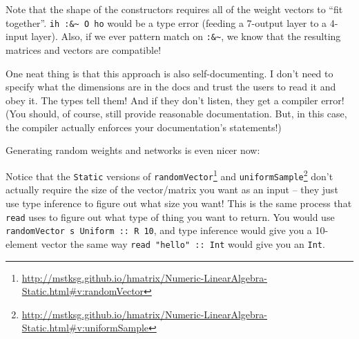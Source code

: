 \documentclass[]{article}
\newenvironment{Shaded}{}{}
\newcommand{\KeywordTok}[1]{\textcolor[rgb]{0.00,0.44,0.13}{\textbf{{#1}}}}
\newcommand{\DataTypeTok}[1]{\textcolor[rgb]{0.56,0.13,0.00}{{#1}}}
\newcommand{\DecValTok}[1]{\textcolor[rgb]{0.25,0.63,0.44}{{#1}}}
\newcommand{\CommentTok}[1]{\textcolor[rgb]{0.38,0.63,0.69}{\textit{{#1}}}}
\newcommand{\OtherTok}[1]{\textcolor[rgb]{0.00,0.44,0.13}{{#1}}}
\newcommand{\FunctionTok}[1]{\textcolor[rgb]{0.02,0.16,0.49}{{#1}}}
\newcommand{\NormalTok}[1]{{#1}}
\renewcommand{\href}[2]{#2\footnote{\url{#1}}}
\begin{document}
Note that the shape of the constructors requires all of the weight
vectors to ``fit together''. \texttt{ih\ :\&\textasciitilde{}\ O\ ho}
would be a type error (feeding a 7-output layer to a 4-input layer).
Also, if we ever pattern match on \texttt{:\&\textasciitilde{}}, we know
that the resulting matrices and vectors are compatible!

One neat thing is that this approach is also self-documenting. I don't
need to specify what the dimensions are in the docs and trust the users
to read it and obey it. The types tell them! And if they don't listen,
they get a compiler error! (You should, of course, still provide
reasonable documentation. But, in this case, the compiler actually
enforces your documentation's statements!)

Generating random weights and networks is even nicer now:

\begin{Shaded}
\end{Shaded}

Notice that the \texttt{Static} versions of
\href{http://mstksg.github.io/hmatrix/Numeric-LinearAlgebra-Static.html\#v:randomVector}{\texttt{randomVector}}
and
\href{http://mstksg.github.io/hmatrix/Numeric-LinearAlgebra-Static.html\#v:uniformSample}{\texttt{uniformSample}}
don't actually require the size of the vector/matrix you want as an
input -- they just use type inference to figure out what size you want!
This is the same process that \texttt{read} uses to figure out what type
of thing you want to return. You would use
\texttt{randomVector\ s\ Uniform\ ::\ R\ 10}, and type inference would
give you a 10-element vector the same way
\texttt{read\ "hello"\ ::\ Int} would give you an \texttt{Int}.
\end{document}
